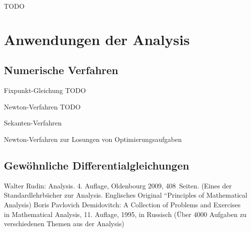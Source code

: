 TODO 

\chapter{Anwendungen der Analysis} 

\section{Numerische Verfahren}

\begin{bem}
	Fixpunkt-Gleichung TODO
\end{bem} 

\begin{bem} 
	Newton-Verfahren TODO
\end{bem} 

\begin{bem}
	Sekanten-Verfahren
\end{bem} 

\begin{bem}
	Newton-Verfahren zur Losungen von Optimierungsaufgaben
\end{bem} 

\section{Gewöhnliche Differentialgleichungen} 







\backmatter

\begin{thebibliography}{AAA}
	 Walter Rudin: Analysis. 4. Auflage, Oldenbourg 2009, 408~Seiten.  (Eines der Standardlehrbücher zur Analysis. Englisches Original ``Principles of Mathematical Analysis)
	 Boris Pavlovich Demidovitch: A Collection of Problems and Exercises in Mathematical Analysis, 11. Auflage, 1995, in Russisch (Über 4000 Aufgaben zu verschiedenen Themen aus der Analysis)
\end{thebibliography} 
%
%


